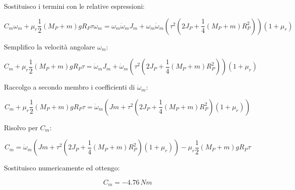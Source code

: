 \documentclass[main.tex]{subfiles}
\begin{document}
Sostituisco i termini con le relative espressioni:

\begin{equation}
	C_m\omega_m + \mu_r\dfrac{1}{2}(M_P + m)gR_P\tau\omega_m =  \omega_m\dot{\omega}_mJ_m +\omega_m\dot{\omega}_m(\tau^2(2J_P + \dfrac{1}{4}(M_P + m)R_P^2))(1+\mu_r)
\end{equation}

Semplifico la velocità angolare $\omega_m$:

\begin{equation}
	C_m + \mu_r\dfrac{1}{2}(M_P + m)gR_P\tau =  \dot{\omega}_mJ_m + \dot{\omega}_m(\tau^2(2J_P + \dfrac{1}{4}(M_P + m)R_P^2))(1+\mu_r)
\end{equation}

Raccolgo a secondo membro i coefficienti di $\dot{\omega}_m$:

\begin{equation}
	C_m + \mu_r\dfrac{1}{2}(M_P + m)gR_P\tau =  \dot{\omega}_m(Jm + \tau^2(2J_P + \dfrac{1}{4}(M_P + m)R_P^2)(1+\mu_r))
\end{equation}

Risolvo per $C_m$:

\begin{equation}
	C_m =  \dot{\omega}_m(Jm + \tau^2(2J_P + \dfrac{1}{4}(M_P + m)R_P^2)(1+\mu_r)) - \mu_r\dfrac{1}{2}(M_P + m)gR_P\tau
\end{equation}

Sostituisco numericamente ed ottengo:

\[
	C_m = -4.76\,Nm
\]
\end{document}
